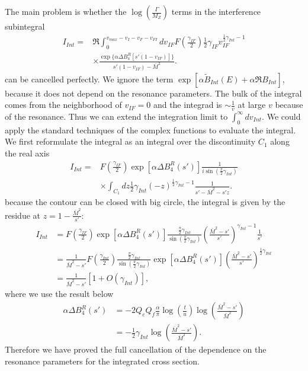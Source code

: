 The main problem is whether the $\log\left(\frac{\Gamma}{M_Z}\right)$ terms in the interference subintegral
\begin{align}
I_{Int}=&\Re\int_{0}^{v_{max}-v_I-v_F-v_{FI}}dv_{IF}F\left(\frac{\gamma_{IF}}{2}\right)\frac{1}{2}\gamma_{IF}v_{IF}^{\frac{1}{2}\gamma_{Int}-1}\nonumber\\
&\times\frac{\exp\{\alpha\Delta B_4^R[s'(1-v_{IF})]\}}{s'(1-v_{IF})-\bar{M}^2}.
\end{align}
can be cancelled perfectly. We ignore the term $\exp[\alpha\widetilde{B}_{Int}(E)+\alpha\Re B_{Int}]$, because  it does not depend on the resonance parameters. The bulk of the integral comes from the neighborhood of $v_{IF}=0$ and the integrad is $\sim\frac{1}{v}$ at large $v$ because of the resonance. Thus we can extend the integration limit to $\int_{0}^{\infty}dv_{Int}$. We could apply the standard techniques of the complex functions to evaluate the integral. We first reformulate the integral as an integral over the discontinuity $C_1$ along the real axis
\begin{align}
I_{Int}=&F\left(\frac{\gamma_{IF}}{2}\right)\exp[\alpha\Delta B^R_4(s')]\frac{1}{i\sin(\frac{\pi}{2}\gamma_{Int})}\nonumber\\
&\times\int_{C_1}dz\frac{1}{2}\gamma_{Int}(-z)^{\frac{1}{2}\gamma_{Int}-1}\frac{1}{s'-\bar{M}^2-s'z}.
\end{align}
because the contour can be closed with big circle, the integral is given by the residue at $z=1-\frac{\bar{M}^2}{s'}$:
\begin{align}
I_{Int}&=F\left(\frac{\gamma_{IF}}{2}\right)\exp[\alpha\Delta B^R_4(s')]\frac{\frac{\pi}{2}\gamma_{Int}}{\sin(\frac{\pi}{2}\gamma_{Int})}\left(\frac{\bar{M}^2-s'}{s'}\right)^{\gamma_{Int}-1}\frac{1}{s'}\nonumber\\
&=\frac{1}{\bar{M}^2-s'}F\left(\frac{\gamma_{Int}}{2}\right)\frac{\frac{\pi}{2}\gamma_{Int}}{\sin(\frac{\pi}{2}\gamma_{Int})}\exp[\alpha\Delta B^R_4(s')]\left(\frac{\bar{M}^2-s'}{s'}\right)^{\frac{1}{2}\gamma_{Int}}\nonumber\\
&=\frac{1}{\bar{M}^2-s'}[1+O(\gamma_{Int})],
\end{align}
where we use the result below
\begin{align}
\alpha\Delta B^R_4(s')&=-2Q_eQ_f\frac{\alpha}{\pi}\log\left(\frac{t}{u}\right)\log\left(\frac{\bar{M}^2-s'}{\bar{M}^2}\right)\nonumber\\
&=-\frac{1}{2}\gamma_{Int}\log\left(\frac{\bar{M}^2-s'}{\bar{M}^2}\right).
\end{align}
Therefore we have proved the full cancellation of the dependence on the resonance parameters for the integrated cross section. 

